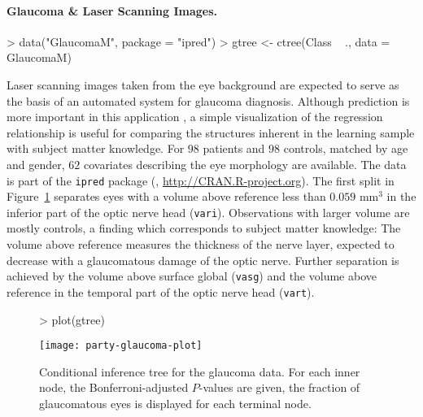 \documentclass[letter]{article}
\begin{document}
\paragraph{Glaucoma \& Laser Scanning Images.}

\begin{Schunk}
\begin{Sinput}
> data("GlaucomaM", package = "ipred")
> gtree <- ctree(Class ~ ., data = GlaucomaM)
\end{Sinput}
\end{Schunk}


Laser scanning images taken from the eye background are expected to serve as 
the basis of an automated system for glaucoma diagnosis. 
Although prediction is more important in this application
\citep{new-glauco:2003}, a simple
visualization of the regression relationship is useful for comparing the
structures inherent in the learning sample with subject matter knowledge. 
For $98$ patients and $98$ controls, matched by age
and gender, $62$ covariates describing the eye morphology are available. The
data is part of the 
\texttt{ipred} package
(\cite{Rnews:Peters+Hothorn+Lausen:2002}, \url{http://CRAN.R-project.org}).
The first split in Figure~\ref{glaucoma} separates eyes with a volume 
above reference less than
$0.059 \text{ mm}^3$ in the inferior part of the
optic nerve head (\texttt{vari}). 
Observations with larger volume are mostly controls, a finding which
corresponds to subject matter knowledge: The volume above reference measures the
thickness of the nerve layer, expected to decrease with a glaucomatous
damage of the optic nerve. Further separation is achieved by the volume
above surface global (\texttt{vasg}) and the volume above reference in the
temporal part of the optic nerve head (\texttt{vart}).

\begin{figure}[t]
\begin{center}
\begin{Schunk}
\begin{Sinput}
> plot(gtree)
\end{Sinput}
\end{Schunk}
\texttt{[image: party-glaucoma-plot]}
\caption{Conditional inference tree for the glaucoma data. For each inner node, the
Bonferroni-adjusted $P$-values are given, the fraction of glaucomatous eyes
is displayed for each terminal node. \label{glaucoma}}
\end{center}
\end{figure}
\end{document}
